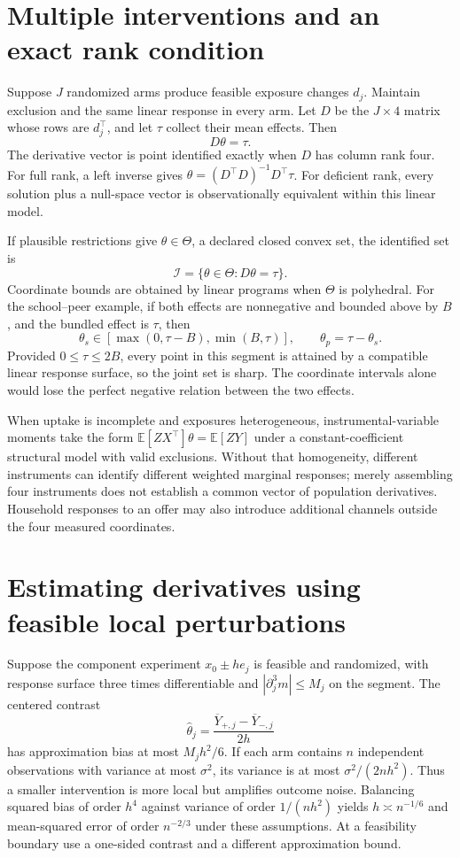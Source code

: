 \documentclass[11pt]{article}
\newcommand{\E}{\mathbb E}
\begin{document}
\section*{Multiple interventions and an exact rank condition}
Suppose $J$ randomized arms produce feasible exposure changes $d_j$. Maintain exclusion and the same linear response in every arm. Let $D$ be the $J\times4$ matrix whose rows are $d_j^\top$, and let $\tau$ collect their mean effects. Then
\[
 D\theta=\tau.                                      \tag{2}
\]
The derivative vector is point identified exactly when $D$ has column rank four. For full rank, a left inverse gives $\theta=(D^\top D)^{-1}D^\top\tau$. For deficient rank, every solution plus a null-space vector is observationally equivalent within this linear model.

If plausible restrictions give $\theta\in\Theta$, a declared closed convex set, the identified set is
\[
 \mathcal I=\{\theta\in\Theta:D\theta=\tau\}.
\]
Coordinate bounds are obtained by linear programs when $\Theta$ is polyhedral. For the school--peer example, if both effects are nonnegative and bounded above by $B$, and the bundled effect is $\tau$, then
\[
 \theta_s\in[\max(0,\tau-B),\min(B,\tau)],\qquad
 \theta_p=\tau-\theta_s.
\]
Provided $0\leq\tau\leq2B$, every point in this segment is attained by a compatible linear response surface, so the joint set is sharp. The coordinate intervals alone would lose the perfect negative relation between the two effects.

When uptake is incomplete and exposures heterogeneous, instrumental-variable moments take the form $\E[ZX^\top]\theta=\E[ZY]$ under a constant-coefficient structural model with valid exclusions. Without that homogeneity, different instruments can identify different weighted marginal responses; merely assembling four instruments does not establish a common vector of population derivatives. Household responses to an offer may also introduce additional channels outside the four measured coordinates.

\section*{Estimating derivatives using feasible local perturbations}
Suppose the component experiment $x_0\pm h e_j$ is feasible and randomized, with response surface three times differentiable and $|\partial_j^3m|\leq M_j$ on the segment. The centered contrast
\[
 \widehat\theta_j=\frac{\overline Y_{+,j}-\overline Y_{-,j}}{2h}
\]
has approximation bias at most $M_jh^2/6$. If each arm contains $n$ independent observations with variance at most $\sigma^2$, its variance is at most $\sigma^2/(2nh^2)$. Thus a smaller intervention is more local but amplifies outcome noise. Balancing squared bias of order $h^4$ against variance of order $1/(nh^2)$ yields $h\asymp n^{-1/6}$ and mean-squared error of order $n^{-2/3}$ under these assumptions. At a feasibility boundary use a one-sided contrast and a different approximation bound.
\end{document}
